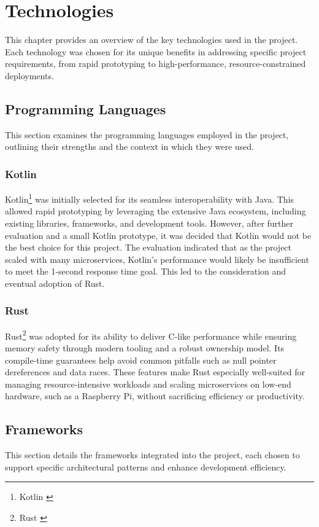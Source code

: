 \renewcommand*\chapterpagestyle{scrheadings}
\chapter{Technologies}

This chapter provides an overview of the key
technologies used in the project.
Each technology was chosen for its unique benefits in
addressing specific project requirements, from rapid
prototyping to high-performance, resource-constrained deployments.

\section{Programming Languages}
This section examines the programming languages employed
in the project,
outlining their strengths and the context in which they
were used.

\subsection{Kotlin}
Kotlin\footnote{Kotlin \cite{kotlin}} was initially selected
for its seamless interoperability with Java.
This allowed rapid prototyping by leveraging the extensive
Java ecosystem, including existing libraries, frameworks,
and development tools.
However, after further evaluation and a small Kotlin prototype,
it was decided that Kotlin would not be the best choice for this project.
The evaluation indicated that as the project scaled with many microservices,
Kotlin's performance would likely be insufficient to meet the 1-second response time goal.
This led to the consideration and eventual adoption of Rust.

\subsection{Rust}
Rust\footnote{Rust \cite{rust}} was adopted for its ability to
deliver C-like performance
while ensuring memory safety through modern tooling and a robust
ownership model.
Its compile-time guarantees help avoid common pitfalls such as
null pointer dereferences and data races.
These features make Rust especially well-suited for managing
resource-intensive workloads
and scaling microservices on low-end hardware, such as a Raspberry Pi,
without sacrificing efficiency or productivity.

\section{Frameworks}
This section details the frameworks integrated into the project,
each chosen to support specific architectural patterns and
enhance development efficiency.

